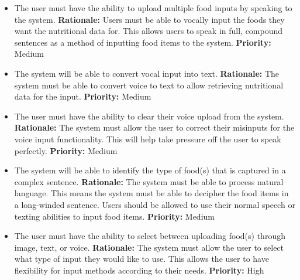 \documentclass[12pt]{article}
\newcounter{FRCounter}
\newcommand{\FillFRNumber}{\textbf{FR\arabic{FRCounter}.} \stepcounter{FRCounter}}
\begin{document}
\begin{itemize}
	\item [\FillFRNumber] The user must have the ability to upload multiple food inputs by speaking to the system.\newline 
	\textbf{Rationale:} Users must be able to vocally input the foods they want the nutritional data for. This allows users to speak in full, compound sentences as a method of inputting food items to the system. \newline
	\textbf{Priority:} Medium
\end{itemize}

\begin{itemize}
	\item [\FillFRNumber] The system will be able to convert vocal input into text.\newline 
	\textbf{Rationale:} The system must be able to convert voice to text to allow retrieving nutritional data for the input.\newline
	\textbf{Priority:} Medium
\end{itemize}

\begin{itemize}
	\item [\FillFRNumber] The user must have the ability to clear their voice upload from the system. \newline
	\textbf{Rationale:} The system must allow the user to correct their misinputs for the voice input functionality. This will help take pressure off the user to speak perfectly. \newline
	\textbf{Priority:} Medium
\end{itemize}

\begin{itemize}
	\item [\FillFRNumber] The system will be able to identify the type of food(s) that is captured in a complex sentence. \newline
	\textbf{Rationale:} The system must be able to process natural language. This means the system must be able to decipher the food items in a long-winded sentence. Users should be allowed to use their normal speech or texting abilities to input food items. \newline
	\textbf{Priority:} Medium
\end{itemize}

\begin{itemize}
	\item [\FillFRNumber] The user must have the ability to select between uploading food(s) through image, text, or voice. \newline
	\textbf{Rationale:} The system must allow the user to select what type of input they would like to use. This allows the user to have flexibility for input methods according to their needs. \newline
	\textbf{Priority:} High
\end{itemize}
\end{document}
